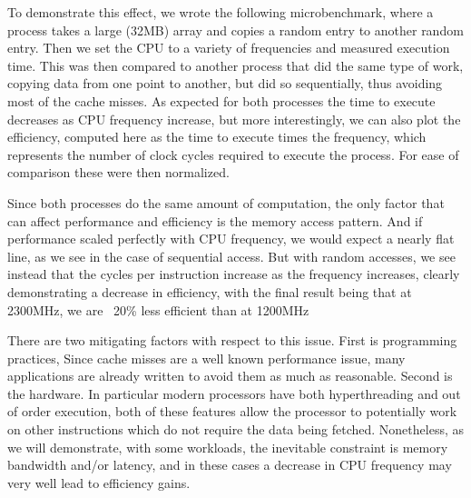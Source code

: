 To demonstrate this effect, we wrote the following microbenchmark, where a process takes a large (32MB) array and copies a random entry to another random entry. Then we set the CPU to a variety of frequencies and measured execution time.  This was then compared to another process that did the same type of work, copying data from one point to another, but did so sequentially, thus avoiding most of the cache misses. As expected for both processes the time to execute decreases as CPU frequency increase, but more interestingly, we can also plot the efficiency, computed here as the time to execute times the frequency, which represents the number of clock cycles required to execute the process. For ease of comparison these were then normalized.

 Since both processes do the same amount of computation, the only factor that can affect performance and efficiency is the memory access pattern. And if performance scaled perfectly with CPU frequency, we would expect a nearly flat line, as we see in the case of sequential access. But with random accesses, we see instead that the cycles per instruction increase as the frequency increases, clearly demonstrating a decrease in efficiency, with the final result being that at 2300MHz, we are ~20\% less efficient than at 1200MHz

There are two mitigating factors with respect to this issue. First is programming practices, Since cache misses are a well known performance issue, many applications are already written to avoid them as much as reasonable. Second is the hardware. In particular modern processors have both hyperthreading and out of order execution, both of these features allow the processor to potentially work on other instructions which do not require the data being fetched. Nonetheless, as we will demonstrate, with some workloads, the inevitable constraint is memory bandwidth and/or latency, and in these cases a decrease in CPU frequency may very well lead to efficiency gains.



